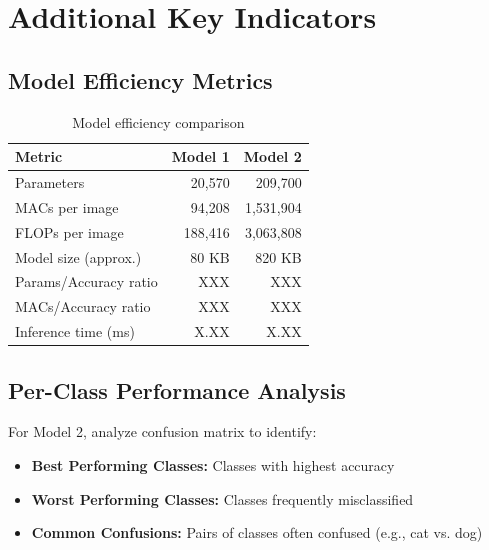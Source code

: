\documentclass[11pt,a4paper]{article}
\begin{document}
\section{Additional Key Indicators}

\subsection{Model Efficiency Metrics}

\begin{table}[H]
\centering
\begin{tabular}{lrr}
\toprule
\textbf{Metric} & \textbf{Model 1} & \textbf{Model 2} \\
\midrule
Parameters & 20,570 & 209,700 \\
MACs per image & 94,208 & 1,531,904 \\
FLOPs per image & 188,416 & 3,063,808 \\
Model size (approx.) & 80 KB & 820 KB \\
Params/Accuracy ratio & XXX & XXX \\
MACs/Accuracy ratio & XXX & XXX \\
Inference time (ms) & X.XX & X.XX \\
\bottomrule
\end{tabular}
\caption{Model efficiency comparison}
\end{table}

\subsection{Per-Class Performance Analysis}

For Model 2, analyze confusion matrix to identify:
\begin{itemize}
    \item \textbf{Best Performing Classes:} Classes with highest accuracy
    \item \textbf{Worst Performing Classes:} Classes frequently misclassified
    \item \textbf{Common Confusions:} Pairs of classes often confused (e.g., cat vs. dog)
\end{itemize}

\end{document}
